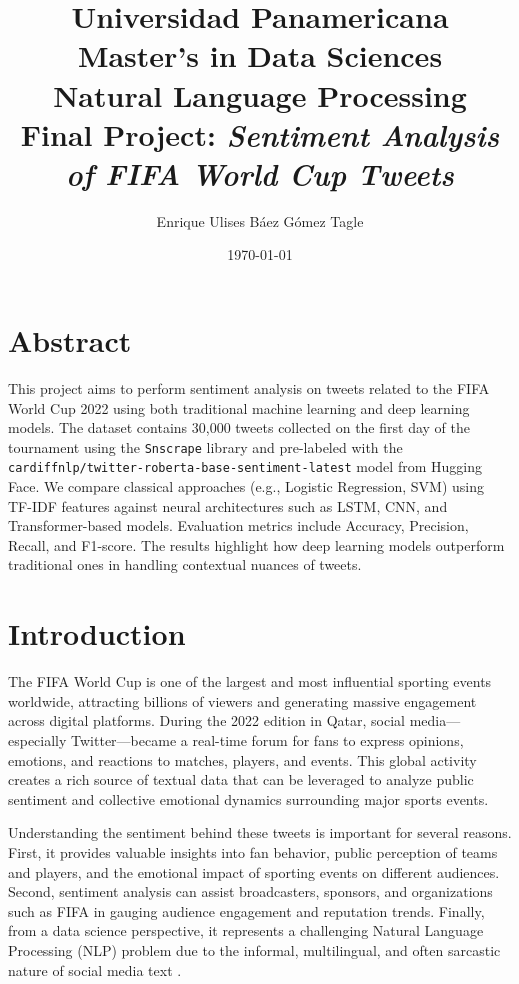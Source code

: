 \documentclass[10pt]{article}
\title{Universidad Panamericana \\ Master's in Data Sciences \\ Natural Language Processing \\ 
    \vspace{0.5cm} Final Project: \textit{Sentiment Analysis of FIFA World Cup Tweets}}
\author{Enrique Ulises Báez Gómez Tagle}
\date{\today}
\begin{document}
\maketitle
\tableofcontents
\newpage
\section*{Abstract}
This project aims to perform sentiment analysis on tweets related to the FIFA World Cup 2022 using both traditional machine learning and deep learning models. 
The dataset contains 30,000 tweets collected on the first day of the tournament using the \texttt{Snscrape} library and pre-labeled with the\\ \texttt{cardiffnlp/twitter-roberta-base-sentiment-latest} model from Hugging Face.
We compare classical approaches (e.g., Logistic Regression, SVM) using TF-IDF features against neural architectures such as LSTM, CNN, and Transformer-based models. 
Evaluation metrics include Accuracy, Precision, Recall, and F1-score. The results highlight how deep learning models outperform traditional ones in handling contextual nuances of tweets.
\section{Introduction}
The FIFA World Cup is one of the largest and most influential sporting events worldwide, attracting billions of viewers and generating massive engagement across digital platforms. During the 2022 edition in Qatar, social media—especially Twitter—became a real-time forum for fans to express opinions, emotions, and reactions to matches, players, and events. This global activity creates a rich source of textual data that can be leveraged to analyze public sentiment and collective emotional dynamics surrounding major sports events.

Understanding the sentiment behind these tweets is important for several reasons. First, it provides valuable insights into fan behavior, public perception of teams and players, and the emotional impact of sporting events on different audiences. Second, sentiment analysis can assist broadcasters, sponsors, and organizations such as FIFA in gauging audience engagement and reputation trends. Finally, from a data science perspective, it represents a challenging Natural Language Processing (NLP) problem due to the informal, multilingual, and often sarcastic nature of social media text \cite{ref1, ref2, ref3}.
\end{document}
